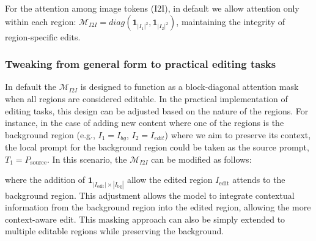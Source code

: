 \documentclass{article}
\begin{document}
For the attention among image tokens (I2I), in default we allow attention only within each region: $\mathcal{M}_{I2I}=diag(\mathbf{1}_{|I_1|^2}, \mathbf{1}_{|I_2|^2})$, maintaining the integrity of region-specific edits.

\subsubsection{Tweaking from general form to practical editing tasks}




In default the $\mathcal{M}_{I2I}$ is designed to function as a block-diagonal attention mask when all regions are considered editable. In the practical implementation of editing tasks, this design can be adjusted based on the nature of the regions. For instance, in the case of adding new content where one of the regions is the background region (e.g., $I_1=I_{bg}$, $I_2=I_{edit}$) where we aim to preserve its context, the local prompt for the background region could be taken as the source prompt, $T_1=P_\text{source}$. In this scenario, the $\mathcal{M}_{I2I}$ can be modified as follows:


where the addition of $\mathbf{1}_{|I_\text{edit}|\times|I_\text{bg}|}$ allow the edited region $I_\text{edit}$ attends to the background region. This adjustment allows the model to integrate contextual information from the background region into the edited region, allowing the more context-aware edit. This masking approach can also be simply extended to multiple editable regions while preserving the background.
\end{document}
